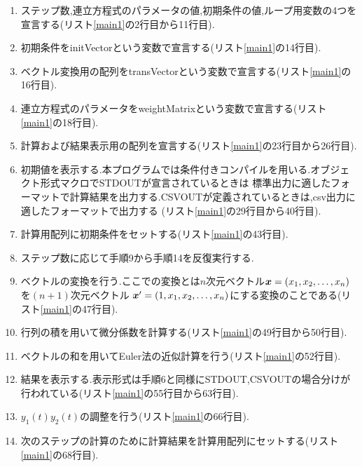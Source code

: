 \documentclass[a4j]{jarticle}
\def\vector#1{\mbox{\boldmath $#1$}}
\begin{document}
\begin{enumerate}
  \item ステップ数,連立方程式のパラメータの値,初期条件の値,ループ用変数の4つを宣言する(リスト\ref{main1}の2行目から11行目).
  \item 初期条件をinitVectorという変数で宣言する(リスト\ref{main1}の14行目).
  \item ベクトル変換用の配列をtransVectorという変数で宣言する(リスト\ref{main1}の16行目).
  \item 連立方程式のパラメータをweightMatrixという変数で宣言する(リスト\ref{main1}の18行目).
  \item 計算および結果表示用の配列を宣言する(リスト\ref{main1}の23行目から26行目).
  \item 初期値を表示する.本プログラムでは条件付きコンパイルを用いる.オブジェクト形式マクロでSTDOUTが宣言されているときは
  標準出力に適したフォーマットで計算結果を出力する.CSVOUTが定義されているときは,csv出力に適したフォーマットで出力する
  (リスト\ref{main1}の29行目から40行目).
  \item 計算用配列に初期条件をセットする(リスト\ref{main1}の43行目).
  \item ステップ数に応じて手順9から手順14を反復実行する.
  \item ベクトルの変換を行う.ここでの変換とは$n$次元ベクトル$\vector{x}=(x_1,x_2,\dots,x_n)$を$(n+1)$次元ベクトル
  $\vector{x}'=(1,x_1,x_2,\dots,x_n)$にする変換のことである(リスト\ref{main1}の47行目).
  \item 行列の積を用いて微分係数を計算する(リスト\ref{main1}の49行目から50行目).
  \item ベクトルの和を用いてEuler法の近似計算を行う(リスト\ref{main1}の52行目).
  \item 結果を表示する.表示形式は手順6と同様にSTDOUT,CSVOUTの場合分けが行われている(リスト\ref{main1}の55行目から63行目).
  \item $y_1(t)y_2(t)$の調整を行う(リスト\ref{main1}の66行目).
  \item 次のステップの計算のために計算結果を計算用配列にセットする(リスト\ref{main1}の68行目).
\end{enumerate}
\end{document}
